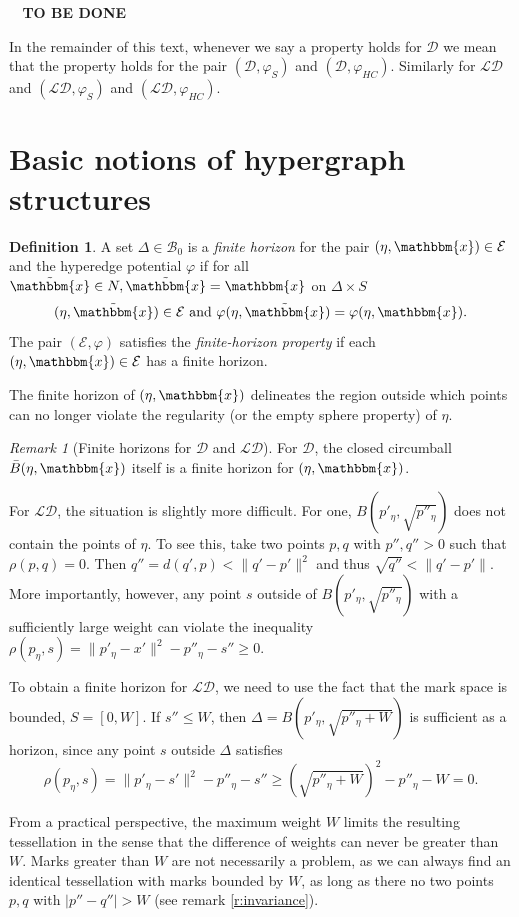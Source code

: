 \documentclass[12pt,a4paper]{article}
\theoremstyle{definition}
\newtheorem{definition}{Definition}
\theoremstyle{remark}
\newtheorem{remark}{Remark}
\theoremstyle{theorem}
\newcommand{\tbd}{\textbf{{\color{red}~ TO BE DONE ~}}}
\newcommand{\x}{\mathbbm{x}}
\begin{document}
\tbd 

In the remainder of this text, whenever we say a property holds for $\mathcal D$ we mean that the property holds for the pair $(\mathcal D,\varphi_S)$ and $(\mathcal D,\varphi_{HC})$. Similarly for $\mathcal {LD}$ and $(\mathcal {LD},\varphi_S)$ and $(\mathcal {LD}, \varphi_{HC})$.




\section{Basic notions of hypergraph structures}

\begin{definition}
	A set $\Delta \in \mathcal B_0$ is a \textit{finite horizon} for the pair $(\eta,\x) \in \mathcal E$ and the hyperedge potential $\varphi$ if for all $\tilde{\x} \in N, \tilde{\x} = \x$ on $\Delta\times S$ 
$$(\eta,\tilde{\x})\in\mathcal E \text{ and } \varphi(\eta,\tilde{\x}) = \varphi(\eta,\x). $$
The pair $(\mathcal E, \varphi)$ satisfies the \textit{finite-horizon property} if each $(\eta,\x)\in \mathcal E$ has a finite horizon.
\end{definition}

The finite horizon of $(\eta,\x)$ delineates the region outside which points can no longer violate the regularity (or the empty sphere property) of $\eta$. 

\begin{remark} [Finite horizons for $\mathcal D$ and $\mathcal {LD}$]
For $\mathcal D$, the closed circumball $\bar B(\eta,\x)$ itself is a finite horizon for $(\eta,\x)$.

For $\mathcal {LD}$, the situation is slightly more difficult. For one, $B(p'_\eta, \sqrt{p''_\eta})$ does not contain the points of $\eta$. To see this, take two points $p,q$ with $p'',q''>0$ such that $\rho(p,q)=0$. Then $q'' = d(q',p) < \|q'-p'\|^2$ and thus $\sqrt{q''} < \|q'-p'\|$. More importantly, however, any point $s$ outside of $B(p'_\eta, \sqrt{p''_\eta})$ with a sufficiently large weight can violate the inequality $\rho(p_\eta,s) = \|p'_\eta - x'\|^2 - p''_\eta - s'' \geq 0$. 

To obtain a finite horizon for $\mathcal {LD}$, we need to use the fact that the mark space is bounded, $S=[0,W]$. If $s'' \leq W$, then $\Delta = B(p'_\eta, \sqrt{p''_\eta + W})$ is sufficient as a horizon, since any point $s$ outside $\Delta$ satisfies
$$\rho(p_\eta, s) = \|p'_\eta - s'\|^2 - p''_\eta - s'' \geq (\sqrt{p''_\eta+W})^2-p''_\eta-W = 0.$$ 

From a practical perspective, the maximum weight $W$ limits the resulting tessellation in the sense that the difference of weights can never be greater than $W$. Marks greater than $W$ are not necessarily a problem, as we can always find an identical tessellation with marks bounded by $W$, as long as there no two points $p,q$ with $|p''-q''|>W$ (see remark \ref{r:invariance}).
\end{remark} 
\end{document}
